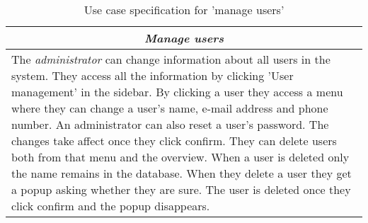 \begin{table}
\centering
\begin{tabular}{p{12cm}}
\hline
\multicolumn{1}{c}{\textit{\textbf{Manage users}}} \\
\hline
The \textit{administrator} can change information about all users in the system.
They access all the information by clicking 'User management' in the sidebar.
By clicking a user they access a menu where they can change a user's name, e-mail address and phone number.
An administrator can also reset a user's password.
The changes take affect once they click confirm.
They can delete users both from that menu and the overview.
When a user is deleted only the name remains in the database.
When they delete a user they get a popup asking whether they are sure.
The user is deleted once they click confirm and the popup disappears.
\\\hline
\end{tabular}
\caption{Use case specification for 'manage users'}\label{tab:user-management}
\end{table}